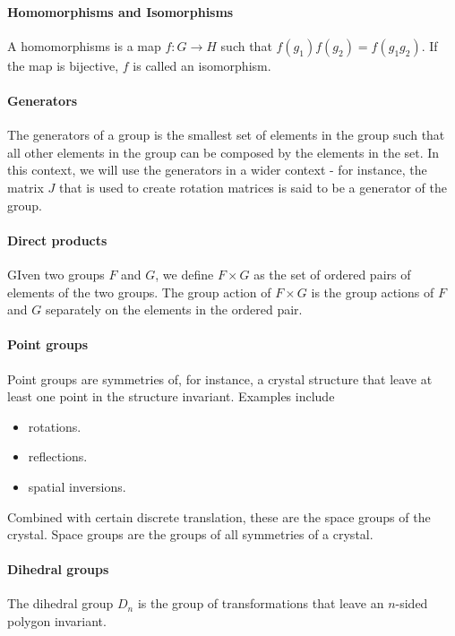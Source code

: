 
\paragraph{Homomorphisms and Isomorphisms}
A homomorphisms is a map $f: G\to H$ such that $f(g_{1})f(g_{2}) = f(g_{1}g_{2})$. If the map is bijective, $f$ is called an isomorphism.

\paragraph{Generators}
The generators of a group is the smallest set of elements in the group such that all other elements in the group can be composed by the elements in the set. In this context, we will use the generators in a wider context - for instance, the matrix $J$ that is used to create rotation matrices is said to be a generator of the group.

\paragraph{Direct products}
GIven two groups $F$ and $G$, we define $F\times G$ as the set of ordered pairs of elements of the two groups. The group action of $F\times G$ is the group actions of $F$ and $G$ separately on the elements in the ordered pair.

\paragraph{Point groups}
Point groups are symmetries of, for instance, a crystal structure that leave at least one point in the structure invariant. Examples include
\begin{itemize}
	\item rotations.
	\item reflections.
	\item spatial inversions.
\end{itemize}
Combined with certain discrete translation, these are the space groups of the crystal. Space groups are the groups of all symmetries of a crystal.

\paragraph{Dihedral groups}
The dihedral group $D_{n}$ is the group of transformations that leave an $n$-sided polygon invariant.

